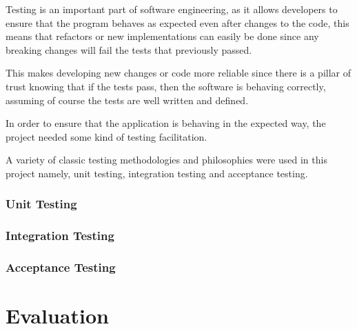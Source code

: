 \documentclass[12pt]{article}
\newcommand{\sentence}{} %
\begin{document}
    \tab
    Testing is an important part of software engineering, as it allows developers to ensure that the program behaves
    as expected even after changes to the code, this means that refactors or new implementations can easily be done
    since any breaking changes will fail the tests that previously passed.
    \sentence
    This makes developing new changes or code more reliable since there is a pillar of trust knowing that if the
    tests pass, then the software is behaving correctly, assuming of course the tests are well written and defined.
    \sentence
    In order to ensure that the application is behaving in the expected way, the project needed some kind of
    testing facilitation.
    \sentence
    A variety of classic testing methodologies and philosophies were used in this project namely, unit testing,
    integration testing and acceptance testing.

    \subsubsection{Unit Testing}\label{subsubsec:unit-testing}


    \subsubsection{Integration Testing}\label{subsubsec:integration-testing}


    \subsubsection{Acceptance Testing}\label{subsubsec:acceptance-testing}


    \pagebreak


    \section{Evaluation}\label{sec:evaluation}

\end{document}

